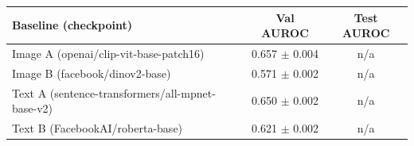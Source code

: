 \begin{tabular}{lcc}
\toprule
Baseline (checkpoint) & Val AUROC & Test AUROC \\
\midrule
Image A (openai/clip-vit-base-patch16) & 0.657 $\pm$ 0.004 & n/a \\
Image B (facebook/dinov2-base) & 0.571 $\pm$ 0.002 & n/a \\
Text A (sentence-transformers/all-mpnet-base-v2) & 0.650 $\pm$ 0.002 & n/a \\
Text B (FacebookAI/roberta-base) & 0.621 $\pm$ 0.002 & n/a \\
\bottomrule
\end{tabular}
